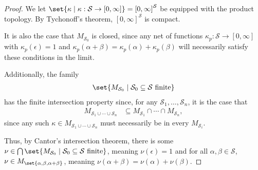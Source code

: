 \documentclass[10pt]{mypackage}
\begin{document}
\begin{proof}
    We let $\set{\kappa\mid \kappa: \mathcal{S}\rightarrow [0,\infty]} = \left[0,\infty\right]^{\mathcal{S}}$ be equipped with the product topology. By Tychonoff's theorem, $\left[0,\infty\right]^{\mathcal{S}}$ is compact.\newline

    It is also the case that $M_{\mathcal{S}_0}$ is closed, since any net of functions $\kappa_{p}: \mathcal{S}\rightarrow [0,\infty]$ with $\kappa_{p}\left(\epsilon\right) = 1$ and $\kappa_{p}\left(\alpha + \beta\right) = \kappa_{p}\left(\alpha\right) + \kappa_{p}\left(\beta\right)$ will necessarily satisfy these conditions in the limit.\newline

    Additionally, the family
    \begin{align*}
      \set{M_{\mathcal{S}_0}\mid \mathcal{S}_0\subseteq \mathcal{S}\text{ finite}}
    \end{align*}
    has the finite intersection property since, for any $\mathcal{S}_1,\dots,\mathcal{S}_n$, it is the case that
    \begin{align*}
      M_{\mathcal{S}_1\cup\cdots\cup \mathcal{S}_n} &\subseteq M_{\mathcal{S}_1}\cap \cdots \cap M_{\mathcal{S}_n},
    \end{align*}
    since any such $\kappa\in M_{\mathcal{S}_1\cup\cdots\cup \mathcal{S}_n}$ must necessarily be in every $M_{\mathcal{S}_i}$.\newline

    Thus, by Cantor's intersection theorem, there is some $\nu\in \bigcap\set{M_{\mathcal{S}_0}\mid \mathcal{S}_0\subseteq \mathcal{S}\text{ finite}}$, meaning $\nu\left(\epsilon\right) = 1$ and for all $\alpha,\beta \in \mathcal{S}$, $\nu \in M_{\set{\alpha,\beta,\alpha + \beta}}$, meaning $\nu\left(\alpha + \beta\right) = \nu\left(\alpha\right) + \nu\left(\beta\right)$.
  \end{proof}
\end{document}
